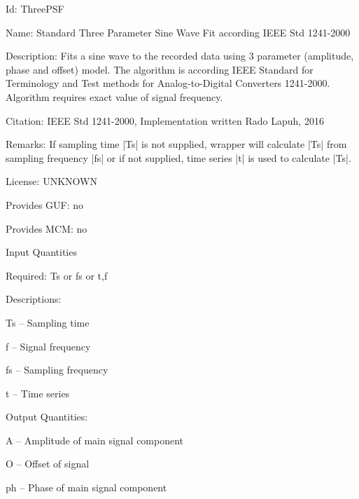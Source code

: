 \begin{tightdesc}
\item [Id:] ThreePSF
\item [Name:] Standard Three Parameter Sine Wave Fit according IEEE Std 1241-2000
\item [Description:] Fits a sine wave to the recorded data using 3 parameter (amplitude, phase and offset) model. The algorithm is according IEEE Standard for Terminology and Test methods for Analog-to-Digital Converters 1241-2000. Algorithm requires exact value of signal frequency.
\item [Citation:] IEEE Std 1241-2000, Implementation written Rado Lapuh, 2016
\item [Remarks:] If sampling time |Ts| is not supplied, wrapper will calculate |Ts| from sampling frequency |fs| or if not supplied, time series |t| is used to calculate |Ts|.
\item [License:] UNKNOWN
\item [Provides GUF:] no
\item [Provides MCM:] no
\item [Input Quantities] \rule{0em}{0em}
    \begin{tightdesc}
    \item [Required:] 
        \textsf{Ts} or \textsf{fs} or \textsf{t},\enspace \textsf{f}
    \item [Descriptions:] \rule{0em}{0em}
        \begin{tightdesc}
            \item[\textsf{Ts}] -- Sampling time
            \item[\textsf{f}] -- Signal frequency
            \item[\textsf{fs}] -- Sampling frequency
            \item[\textsf{t}] -- Time series
        \end{tightdesc}
    \end{tightdesc}
\item [Output Quantities:] \rule{0em}{0em}
    \begin{tightdesc}
        \item[\textsf{A}] -- Amplitude of main signal component
        \item[\textsf{O}] -- Offset of signal
        \item[\textsf{ph}] -- Phase of main signal component
    \end{tightdesc}
\end{tightdesc}
